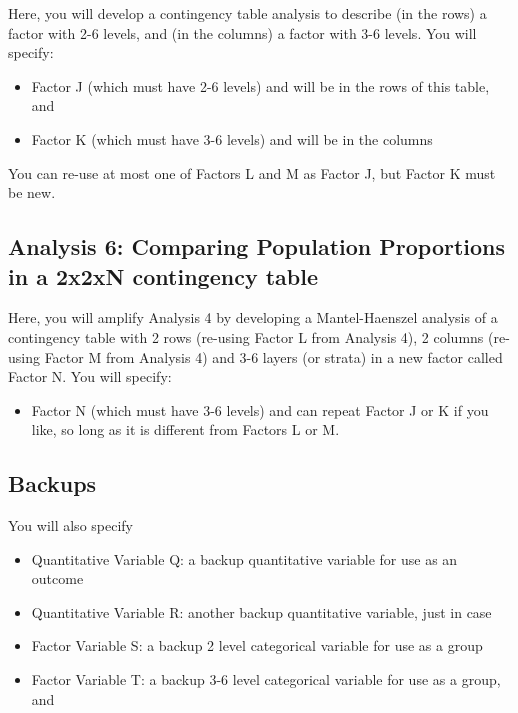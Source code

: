 \documentclass[]{book}
\providecommand{\tightlist}{%
  \setlength{\itemsep}{0pt}\setlength{\parskip}{0pt}}
\begin{document}
Here, you will develop a contingency table analysis to describe (in the rows) a factor with 2-6 levels, and (in the columns) a factor with 3-6 levels. You will specify:

\begin{itemize}
\tightlist
\item
  Factor J (which must have 2-6 levels) and will be in the rows of this table, and
\item
  Factor K (which must have 3-6 levels) and will be in the columns
\end{itemize}

You can re-use at most one of Factors L and M as Factor J, but Factor K must be new.

\hypertarget{analysis-6-comparing-population-proportions-in-a-2x2xn-contingency-table}{%
\subsection{Analysis 6: Comparing Population Proportions in a 2x2xN contingency table}\label{analysis-6-comparing-population-proportions-in-a-2x2xn-contingency-table}}

Here, you will amplify Analysis 4 by developing a Mantel-Haenszel analysis of a contingency table with 2 rows (re-using Factor L from Analysis 4), 2 columns (re-using Factor M from Analysis 4) and 3-6 layers (or strata) in a new factor called Factor N. You will specify:

\begin{itemize}
\tightlist
\item
  Factor N (which must have 3-6 levels) and can repeat Factor J or K if you like, so long as it is different from Factors L or M.
\end{itemize}

\hypertarget{backups}{%
\subsection{Backups}\label{backups}}

You will also specify

\begin{itemize}
\tightlist
\item
  Quantitative Variable Q: a backup quantitative variable for use as an outcome
\item
  Quantitative Variable R: another backup quantitative variable, just in case
\item
  Factor Variable S: a backup 2 level categorical variable for use as a group
\item
  Factor Variable T: a backup 3-6 level categorical variable for use as a group, and
\end{itemize}
\end{document}
